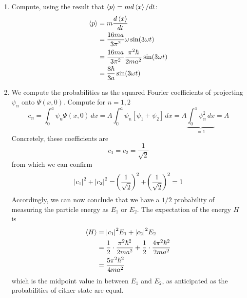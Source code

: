 \documentclass[a4paper]{article}
\begin{document}
\begin{enumerate}[label=(\alph*)]
\[	\]
	which tells us that on average, the particle will be in the first half of the infinite square well at \( t = 0 \). Observe further that \( \psi_{1}, \psi_{2} > 0 \) on \( \!\left[ 0,a/2 \right] \), while \( \psi_{1} > 0 \) but \( \psi_{2} < 0 \) on \( \!\left[ a/2,a \right] \). It follows that the density \( \abs{\Psi \!\left( x,0 \right)}^{2} \) is heaviest along \( \!\left[ 0,a/2 \right] \), which probabilistically comports with our result for \( \braket{x}\!\left( 0 \right) \).
	\item Compute, using the result that \( \braket{p} = m d \braket{x} / dt \):
	\begin{align*}
		\braket{p} & = m \frac{d \braket{x}}{d t} \\
			   & = \frac{16ma}{3 \pi^{2}} \omega \sin\!\left(3 \omega t\right) \\
			   & = \frac{16ma}{3 \pi^{2}}\frac{\pi^{2}\hbar}{2ma^{2}}\sin\!\left(3 \omega t\right) \\
			   & = \frac{8 \hbar}{3a}\sin\!\left(3 \omega t\right)
	\end{align*}
	\item We compute the probabilities as the squared Fourier coefficients of projecting \( \psi_{n} \) onto \( \Psi \!\left( x,0 \right) \). Compute for \( n = 1, 2 \)
	\[
		c_{n} = \int^{a}_{0} \psi_{n}\Psi \!\left( x,0 \right) \, dx = A\int^{a}_{0} \psi_{n}\!\left[ \psi_{1} + \psi_{2} \right] \, dx = A \underbrace{\int^{a}_{0} \psi^{2}_{n} \, dx}_{= 1} = A
	\]
	Concretely, these coefficients are
	\[
		c_{1} = c_{2} = \frac{1}{\sqrt{2}}
	\]
	from which we can confirm
	\[
		\abs{c_{1}}^{2} + \abs{c_{2}}^{2} = \!\left( \frac{1}{\sqrt{2}} \right)^{2} + \!\left( \frac{1}{\sqrt{2}} \right)^{2} = 1 
	\]
	Accordingly, we can now conclude that we have a \( 1 / 2 \) probability of measuring the particle energy as \( E_{1} \) or \( E_{2} \). The expectation of the energy \( H \) is 
	\begin{align*}
		\braket{H} & = \abs{c_{1}}^{2}E_{1} + \abs{c_{2}}^{2}E_{2} \\
			   & = \frac{1}{2} \cdot \frac{\pi^{2}\hbar^{2}}{2ma^{2}} + \frac{1}{2} \cdot \frac{4 \pi^{2}\hbar^{2}}{2ma^{2}} \\
			   & = \frac{5 \pi^{2}\hbar^{2}}{4ma^{2}}
	\end{align*}
	which is the midpoint value in between \( E_{1} \) and \( E_{2} \), as anticipated as the probabilities of either state are equal.
\end{enumerate}
\end{document}

